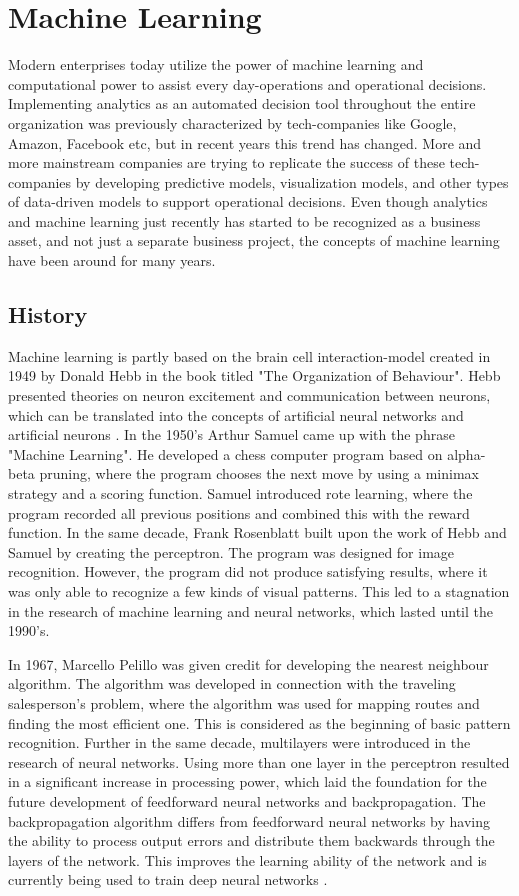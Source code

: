 \section{Machine Learning}
Modern enterprises today utilize the power of machine learning and computational power to assist every day-operations and operational decisions. Implementing analytics as an automated decision tool throughout the entire organization was previously characterized by tech-companies like Google, Amazon, Facebook etc, but in recent years this trend has changed. More and more mainstream companies are trying to replicate the success of these tech-companies by developing predictive models, visualization models, and other types of data-driven models to support operational decisions. Even though analytics and machine learning just recently has started to be recognized as a business asset, and not just a separate business project, the concepts of machine learning have been around for many years.  

\subsection{History}
Machine learning is partly based on the brain cell interaction-model created in 1949 by Donald Hebb in the book titled "The Organization of Behaviour". Hebb presented theories on neuron excitement and communication between neurons, which can be translated into the concepts of artificial neural networks and artificial neurons \cite{dataversity}. In the 1950’s Arthur Samuel came up with the phrase "Machine Learning". He developed a chess computer program based on alpha-beta pruning, where the program chooses the next move by using a minimax strategy and a scoring function. Samuel introduced rote learning, where the program recorded all previous positions and combined this with the reward function. In the same decade, Frank Rosenblatt built upon the work of Hebb and Samuel by creating the perceptron. The program was designed for image recognition. However, the program did not produce satisfying results, where it was only able to recognize a few kinds of visual patterns. This led to a stagnation in the research of machine learning and neural networks, which lasted until the 1990's. 

\indent\newline
In 1967, Marcello Pelillo was given credit for developing the nearest neighbour algorithm. The algorithm was developed in connection with the traveling salesperson's problem, where the algorithm was used for mapping routes and finding the most efficient one. This is considered as the beginning of basic pattern recognition. Further in the same decade, multilayers were introduced in the research of neural networks. Using more than one layer in the perceptron resulted in a significant increase in processing power, which laid the foundation for the future development of feedforward neural networks and backpropagation. The backpropagation algorithm differs from feedforward neural networks by having the ability to process output errors and distribute them backwards through the layers of the network. This improves the learning ability of the network and is currently being used to train deep neural networks \cite{dataversity}. 

